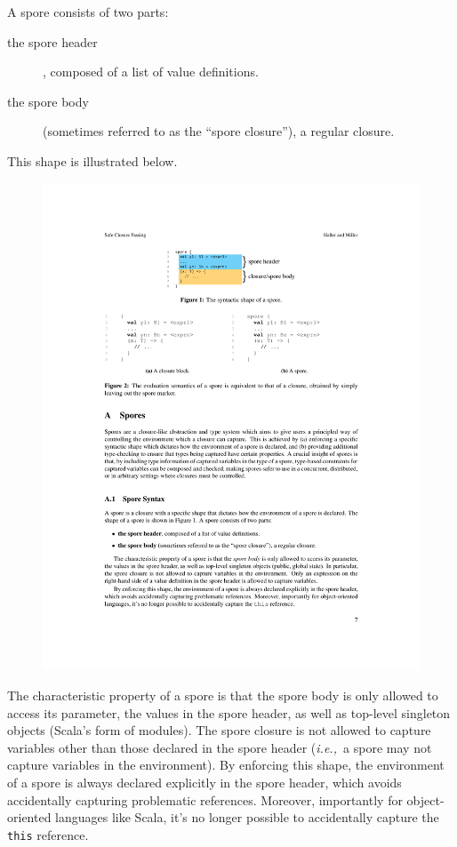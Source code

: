 \documentclass{jfp1}
\newcommand{\ie}{{\em i.e.,~}}
\begin{document}
\vspace{3mm}
\noindent A spore consists of two parts:

\begin{description}
  \item[the spore header], composed of a list of value definitions.
  
  \item[the spore body] (sometimes referred to as the “spore closure”), a
    regular closure.
\end{description}

\noindent This shape is illustrated below.

\begin{figure}[h!]
\centering\includegraphics[width=0.75\columnwidth]{pic/spore-shape.pdf}
\end{figure}

The characteristic property of a spore is that the spore body is only allowed to
access its parameter, the values in the spore header, as well as top-level
singleton objects (Scala's form of modules). The spore closure is not allowed to
capture variables other than those declared in the spore header (\ie a spore may
not capture variables in the environment). By enforcing this shape, the
environment of a spore is always declared explicitly in the spore header, which
avoids accidentally capturing problematic references. Moreover, importantly for
object-oriented languages like Scala, it's no longer possible to accidentally
capture the \verb|this| reference.
\end{document}
